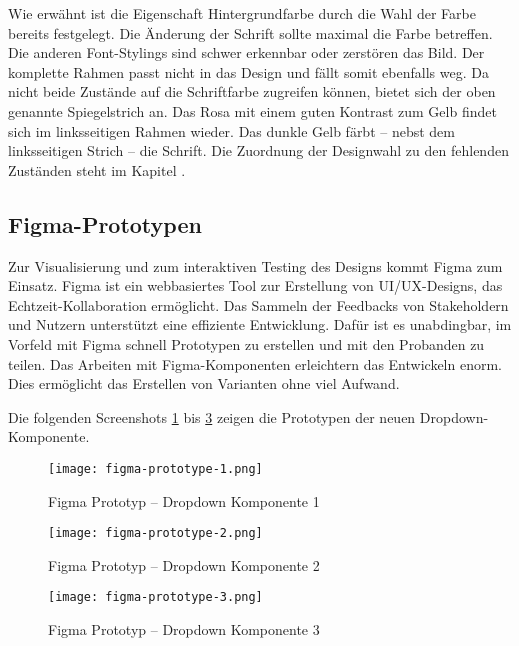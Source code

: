 Wie erwähnt ist die Eigenschaft Hintergrundfarbe durch die Wahl der Farbe bereits festgelegt. 
Die Änderung der Schrift sollte maximal die Farbe betreffen. 
Die anderen Font-Stylings sind schwer erkennbar oder zerstören das Bild. 
Der komplette Rahmen passt nicht in das Design und fällt somit ebenfalls weg. 
Da nicht beide Zustände auf die Schriftfarbe zugreifen können, bietet sich der oben genannte Spiegelstrich an. 
Das Rosa mit einem guten Kontrast zum Gelb findet sich im linksseitigen Rahmen wieder. 
Das dunkle Gelb färbt – nebst dem linksseitigen Strich – die Schrift. 
Die Zuordnung der Designwahl zu den fehlenden Zuständen steht im Kapitel \textbf{}. 


\clearpage
\subsection{Figma-Prototypen}
\label{sec:figmaPrototype}

Zur Visualisierung und zum interaktiven Testing des Designs kommt Figma zum Einsatz. 
Figma ist ein webbasiertes Tool zur Erstellung von UI/UX-Designs, das Echtzeit-Kollaboration ermöglicht. 
Das Sammeln der Feedbacks von Stakeholdern und Nutzern unterstützt eine effiziente Entwicklung. 
Dafür ist es unabdingbar, im Vorfeld mit Figma schnell Prototypen zu erstellen und mit den Probanden zu teilen. 
Das Arbeiten mit Figma-Komponenten erleichtern das Entwickeln enorm. 
Dies ermöglicht das Erstellen von Varianten ohne viel Aufwand. 

Die folgenden Screenshots \ref{img:figmaPrototype1} bis \ref{img:figmaPrototype3} zeigen die Prototypen der neuen Drop\-down-Kom\-po\-nente. 

\begin{figure}[!htb]
    \centering
    \texttt{[image: figma-prototype-1.png]}
    \caption{\centering Figma Prototyp – Dropdown Komponente 1}
    \label{img:figmaPrototype1}
\end{figure}

\begin{figure}[!htb]
    \centering
    \texttt{[image: figma-prototype-2.png]}
    \caption{\centering Figma Prototyp – Dropdown Komponente 2}
    \label{img:figmaPrototype2}
\end{figure}

\begin{figure}[!htb]
    \centering
    \texttt{[image: figma-prototype-3.png]}
    \caption{\centering Figma Prototyp – Dropdown Komponente 3}
    \label{img:figmaPrototype3}
\end{figure}

